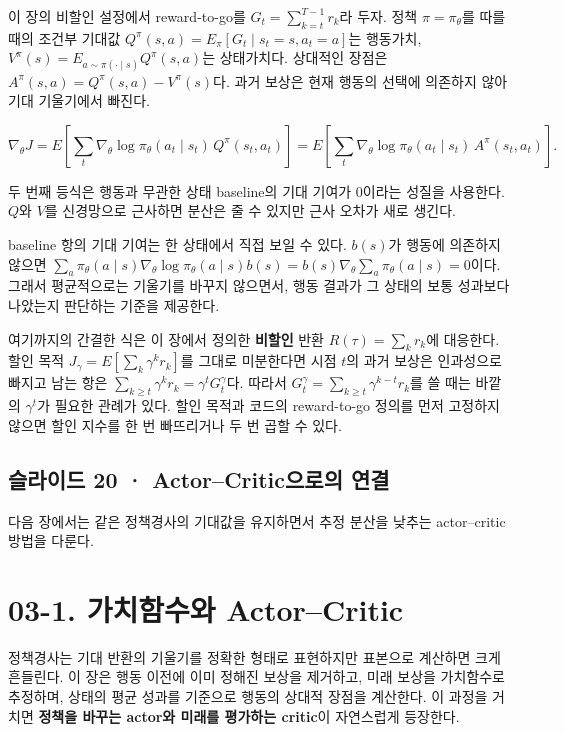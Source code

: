 \documentclass[11pt,a4paper]{article}
\begin{document}
이 장의 비할인 설정에서 reward-to-go를 $G_t=\sum_{k=t}^{T-1}r_k$라 두자. 정책 $\pi=\pi_\theta$를 따를 때의 조건부 기대값 $Q^\pi(s,a)=E_\pi[G_t\mid s_t=s,a_t=a]$는 행동가치, $V^\pi(s)=E_{a\sim\pi(\cdot\mid s)}Q^\pi(s,a)$는 상태가치다. 상대적인 장점은 $A^\pi(s,a)=Q^\pi(s,a)-V^\pi(s)$다. 과거 보상은 현재 행동의 선택에 의존하지 않아 기대 기울기에서 빠진다.\par

\[
\nabla_\theta J
=E\!\left[\sum_t\nabla_\theta\log\pi_\theta(a_t\mid s_t)
\,Q^\pi(s_t,a_t)\right]
=E\!\left[\sum_t\nabla_\theta\log\pi_\theta(a_t\mid s_t)
\,A^\pi(s_t,a_t)\right].
\]

두 번째 등식은 행동과 무관한 상태 baseline의 기대 기여가 0이라는 성질을 사용한다. $Q$와 $V$를 신경망으로 근사하면 분산은 줄 수 있지만 근사 오차가 새로 생긴다.\par

baseline 항의 기대 기여는 한 상태에서 직접 보일 수 있다. $b(s)$가 행동에 의존하지 않으면 $\sum_a\pi_\theta(a\mid s)\nabla_\theta\log\pi_\theta(a\mid s)b(s)=b(s)\nabla_\theta\sum_a\pi_\theta(a\mid s)=0$이다. 그래서 평균적으로는 기울기를 바꾸지 않으면서, 행동 결과가 그 상태의 보통 성과보다 나았는지 판단하는 기준을 제공한다.\par

여기까지의 간결한 식은 이 장에서 정의한 \textbf{비할인} 반환 $R(\tau)=\sum_k r_k$에 대응한다. 할인 목적 $J_\gamma=E[\sum_k\gamma^k r_k]$를 그대로 미분한다면 시점 $t$의 과거 보상은 인과성으로 빠지고 남는 항은 $\sum_{k\ge t}\gamma^k r_k=\gamma^tG_t^\gamma$다. 따라서 $G_t^\gamma=\sum_{k\ge t}\gamma^{k-t}r_k$를 쓸 때는 바깥의 $\gamma^t$가 필요한 관례가 있다. 할인 목적과 코드의 reward-to-go 정의를 먼저 고정하지 않으면 할인 지수를 한 번 빠뜨리거나 두 번 곱할 수 있다.\par

\subsection{슬라이드 20 · Actor–Critic으로의 연결}

다음 장에서는 같은 정책경사의 기대값을 유지하면서 추정 분산을 낮추는 actor–critic 방법을 다룬다.\par

\clearpage
\section{03-1. 가치함수와 Actor–Critic}


정책경사는 기대 반환의 기울기를 정확한 형태로 표현하지만 표본으로 계산하면 크게 흔들린다. 이 장은 행동 이전에 이미 정해진 보상을 제거하고, 미래 보상을 가치함수로 추정하며, 상태의 평균 성과를 기준으로 행동의 상대적 장점을 계산한다. 이 과정을 거치면 \textbf{정책을 바꾸는 actor와 미래를 평가하는 critic}이 자연스럽게 등장한다.\par
\end{document}
